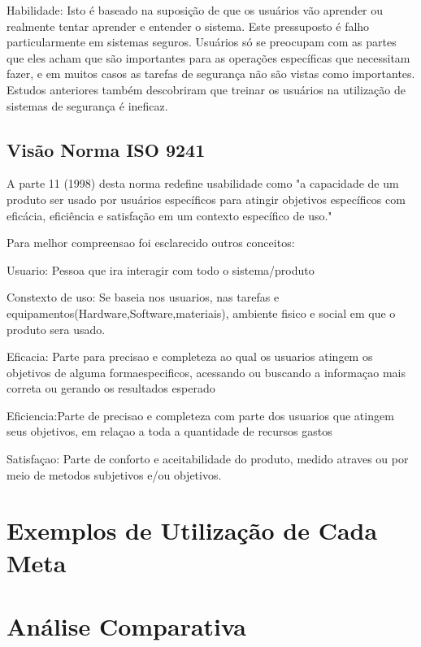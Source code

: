 \documentclass[12pt]{article}
\begin{document}
		Habilidade: Isto é baseado na suposição de que os usuários vão aprender ou realmente tentar aprender e entender o sistema. Este pressuposto é falho particularmente em sistemas seguros. Usuários só se preocupam com as partes que eles acham 	que são importantes para as operações específicas que necessitam fazer, e em muitos casos as tarefas de segurança não são vistas como importantes. Estudos anteriores também descobriram que treinar os usuários na utilização de sistemas de segurança 	é ineficaz.


\subsection{Visão Norma ISO 9241}
	
		A parte 11 (1998) desta norma redefine usabilidade como "a capacidade de um produto ser usado por usuários específicos para atingir objetivos 
		específicos com eficácia, eficiência e satisfação em um contexto específico de uso."

	Para melhor compreensao foi esclarecido outros conceitos:

	Usuario: Pessoa que ira interagir com todo o sistema/produto

	Constexto de uso: Se baseia nos usuarios, nas tarefas e equipamentos(Hardware,Software,materiais), ambiente fisico e social em que o produto sera usado.

	Eficacia: Parte para precisao e completeza ao qual os usuarios atingem os objetivos de alguma formaespecificos, acessando ou buscando a informaçao 
	mais correta ou gerando os resultados esperado

	Eficiencia:Parte de precisao e completeza com parte dos usuarios que atingem seus objetivos, em relaçao a toda a quantidade de recursos gastos

	Satisfaçao: Parte de conforto e aceitabilidade do produto, medido atraves ou por meio de metodos subjetivos e/ou objetivos.

	


\section{Exemplos de Utilização de Cada Meta}


\section{Análise Comparativa}


\end{document}
